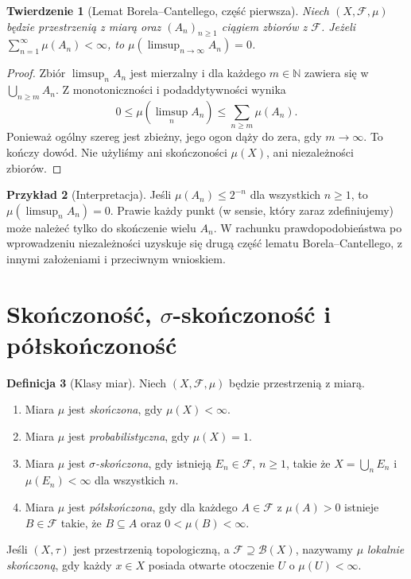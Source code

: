 \documentclass[11pt,a4paper,oneside]{book}
\numberwithin{equation}{chapter}
\theoremstyle{plain}
\newtheorem{twierdzenie}{Twierdzenie}[chapter]
\theoremstyle{definition}
\newtheorem{definicja}[twierdzenie]{Definicja}
\newtheorem{przyklad}[twierdzenie]{Przykład}
\theoremstyle{remark}
\begin{document}
\begin{twierdzenie}[Lemat Borela--Cantellego, część pierwsza]
\label{thm:borel-cantelli-1}
Niech $(X,\mathcal F,\mu)$ będzie przestrzenią z miarą
oraz $(A_n)_{n\geq1}$ ciągiem zbiorów z $\mathcal F$.
Jeżeli $\sum_{n=1}^{\infty}\mu(A_n)<\infty$, to
$\mu(\limsup_{n\to\infty}A_n)=0$.
\end{twierdzenie}
\begin{proof}
Zbiór $\limsup_nA_n$ jest mierzalny i dla każdego
$m\in\mathbb N$ zawiera się w $\bigcup_{n\geq m}A_n$.
Z monotoniczności i podaddytywności wynika
\[
0\leq\mu(\limsup_nA_n)
\leq\sum_{n\geq m}\mu(A_n).
\]
Ponieważ ogólny szereg jest zbieżny, jego ogon dąży do zera,
gdy $m\to\infty$. To kończy dowód. Nie użyliśmy ani
skończoności $\mu(X)$, ani niezależności zbiorów.
\end{proof}

\begin{przyklad}[Interpretacja]
Jeśli $\mu(A_n)\leq2^{-n}$ dla wszystkich $n\geq1$, to
$\mu(\limsup_nA_n)=0$. Prawie każdy punkt (w sensie, który
zaraz zdefiniujemy) może należeć tylko do skończenie wielu $A_n$.
W rachunku prawdopodobieństwa po wprowadzeniu niezależności
uzyskuje się drugą część lematu Borela--Cantellego, z innymi
założeniami i przeciwnym wnioskiem.
\end{przyklad}

\section{Skończoność, \texorpdfstring{$\sigma$}{sigma}-skończoność i półskończoność}

\begin{definicja}[Klasy miar]
\label{def:measure-finiteness}
Niech $(X,\mathcal F,\mu)$ będzie przestrzenią z miarą.
\begin{enumerate}
\item Miara $\mu$ jest \emph{skończona}, gdy $\mu(X)<\infty$.
\item Miara $\mu$ jest \emph{probabilistyczna}, gdy $\mu(X)=1$.
\item Miara $\mu$ jest \emph{$\sigma$-skończona}, gdy istnieją
$E_n\in\mathcal F$, $n\geq1$, takie że
$X=\bigcup_nE_n$ i $\mu(E_n)<\infty$ dla wszystkich $n$.
\item Miara $\mu$ jest \emph{półskończona}, gdy dla każdego
$A\in\mathcal F$ z $\mu(A)>0$ istnieje $B\in\mathcal F$
takie, że $B\subseteq A$ oraz $0<\mu(B)<\infty$.
\end{enumerate}
Jeśli $(X,\tau)$ jest przestrzenią topologiczną, a
$\mathcal F\supseteq\mathcal B(X)$, nazywamy $\mu$
\emph{lokalnie skończoną}, gdy każdy $x\in X$ posiada
otwarte otoczenie $U$ o $\mu(U)<\infty$.
\end{definicja}
\end{document}
